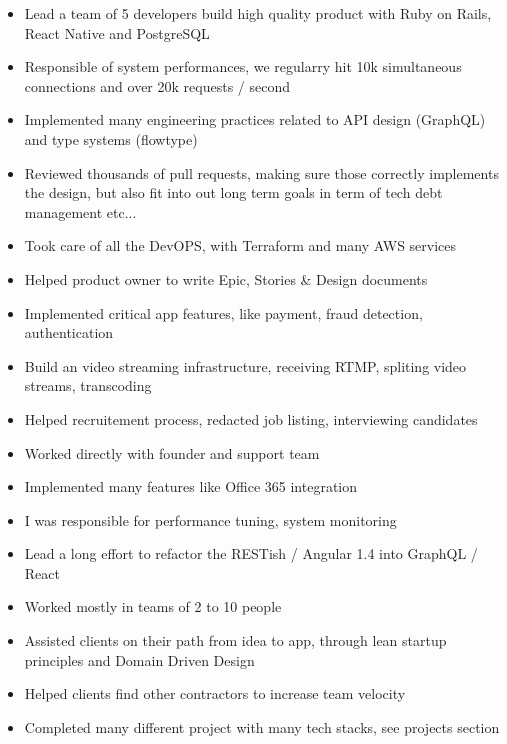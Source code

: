 \documentclass[10pt,a4paper,ragged2e,withhyper]{altacv}
\begin{document}
\begin{paracol}{2}


\begin{itemize}
\item Lead a team of 5 developers build high quality product with Ruby on Rails, React Native and PostgreSQL
\item Responsible of system performances, we regularry hit 10k simultaneous connections and over 20k requests / second
\item Implemented many engineering practices related to API design (GraphQL) and type systems (flowtype)
\item Reviewed thousands of pull requests, making sure those correctly implements the design, but also fit into out long term goals in term of tech debt management etc...
\item Took care of all the DevOPS, with Terraform and many AWS services
\item Helped product owner to write Epic, Stories \& Design documents
\item Implemented critical app features, like payment, fraud detection, authentication
\item Build an video streaming infrastructure, receiving RTMP, spliting video streams, transcoding
\item Helped recruitement process, redacted job listing, interviewing candidates
\end{itemize}

\divider

\begin{itemize}
\item Worked directly with founder and support team
\item Implemented many features like Office 365 integration
\item I was responsible for performance tuning, system monitoring
\item Lead a long effort to refactor the RESTish / Angular 1.4 into GraphQL / React
\end{itemize}

\divider

\begin{itemize}
  \item Worked mostly in teams of 2 to 10 people
  \item Assisted clients on their path from idea to app, through lean startup principles and Domain Driven Design
  \item Helped clients find other contractors to increase team velocity
  \item Completed many different project with many tech stacks, see projects section
\end{itemize}


\end{paracol}
\end{document}
